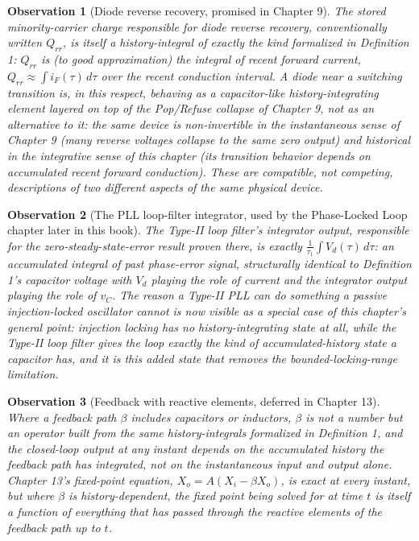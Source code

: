 \documentclass[12pt]{article}
\newtheorem{observation}{Observation}
\begin{document}
\begin{observation}[Diode reverse recovery, promised in Chapter 9]
The stored minority-carrier charge responsible for diode reverse recovery, conventionally written $Q_{rr}$, is itself a history-integral of exactly the kind formalized in Definition 1: $Q_{rr}$ is (to good approximation) the integral of recent forward current, $Q_{rr} \approx \int i_F(\tau)\,d\tau$ over the recent conduction interval. A diode near a switching transition is, in this respect, behaving as a capacitor-like history-integrating element layered on top of the Pop/Refuse collapse of Chapter 9, not as an alternative to it: the same device is non-invertible in the instantaneous sense of Chapter 9 (many reverse voltages collapse to the same zero output) and historical in the integrative sense of this chapter (its transition behavior depends on accumulated recent forward conduction). These are compatible, not competing, descriptions of two different aspects of the same physical device.
\end{observation}

\begin{observation}[The PLL loop-filter integrator, used by the Phase-Locked Loop chapter later in this book]
The Type-II loop filter's integrator output, responsible for the zero-steady-state-error result proven there, is exactly $\frac{1}{\tau_1}\int V_d(\tau)\,d\tau$: an accumulated integral of past phase-error signal, structurally identical to Definition 1's capacitor voltage with $V_d$ playing the role of current and the integrator output playing the role of $v_C$. The reason a Type-II PLL can do something a passive injection-locked oscillator cannot is now visible as a special case of this chapter's general point: injection locking has no history-integrating state at all, while the Type-II loop filter gives the loop exactly the kind of accumulated-history state a capacitor has, and it is this added state that removes the bounded-locking-range limitation.
\end{observation}

\begin{observation}[Feedback with reactive elements, deferred in Chapter 13]
Where a feedback path $\beta$ includes capacitors or inductors, $\beta$ is not a number but an operator built from the same history-integrals formalized in Definition 1, and the closed-loop output at any instant depends on the accumulated history the feedback path has integrated, not on the instantaneous input and output alone. Chapter 13's fixed-point equation, $X_o = A(X_i - \beta X_o)$, is exact at every instant, but where $\beta$ is history-dependent, the fixed point being solved for at time $t$ is itself a function of everything that has passed through the reactive elements of the feedback path up to $t$.
\end{observation}
\end{document}
